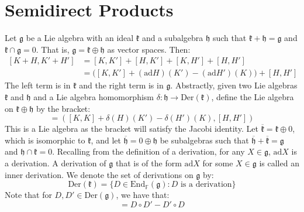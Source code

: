 \documentclass[crop=false,class=article]{standalone}                           %
\begin{document}
    \section{Semidirect Products}
        Let $\mathfrak{g}$ be a Lie algebra with an ideal $\mathfrak{k}$ and a
        subalgebra $\mathfrak{h}$ such that
        $\mathfrak{k}+\mathfrak{h}=\mathfrak{g}$ and
        $\mathfrak{k}\cap\mathfrak{g}=0$. That is,
        $\mathfrak{g}=\mathfrak{k}\oplus\mathfrak{h}$ as vector spaces. Then:
        \begin{subequations}
            \begin{align}
                [K+H,K'+H']&=[K,K']+[H,K']+[K,H']+[H,H']\\
                &=\Big([K,K']+(\textrm{ad}H)(K')-(\textrm{ad}H')(K)\Big)+[H,H']
            \end{align}
        \end{subequations}
        The left term is in $\mathfrak{k}$ and the right term is in
        $\mathfrak{g}$. Abstractly, given two Lie algebras $\mathfrak{k}$ and
        $\mathfrak{h}$ and a Lie algebra homomorphism
        $\delta:\mathfrak{h}\rightarrow\textrm{Der}(\mathfrak{k})$, define the
        Lie algebra on $\mathfrak{k}\oplus\mathfrak{h}$ by the bracket:
        \begin{equation}
            [(K,H),(K',H')]=
            ([K,K]+\delta(H)(K')-\delta(H')(K),[H,H'])
        \end{equation}
        This is a Lie algebra as the bracket will satisfy the Jacobi identity.
        Let $\overline{\mathfrak{k}}=\mathfrak{k}\oplus{0}$, which is isomorphic
        to $\mathfrak{k}$, and let $\overline{\mathfrak{h}}=0\oplus\mathfrak{h}$
        be subalgebras such that
        $\overline{\mathfrak{h}}+\overline{\mathfrak{k}}=\mathfrak{g}$ and
        $\mathfrak{h}\cap\mathfrak{k}=0$. Recalling from the definition of a
        derivation, for any $X\in\mathfrak{g}$, $\textrm{ad}X$ is a derivation.
        A derivation of $\mathfrak{g}$ that is of the form $\textrm{ad}X$ for
        some $X\in\mathfrak{g}$ is called an inner derivation. We denote the
        set of derivations on $\mathfrak{g}$ by:
        \begin{equation}
            \textrm{Der}(\mathfrak{k})=
            \{D\in\textrm{End}_{\mathbb{F}}(\mathfrak{g})
                :D\textrm{ is a derivation}\}
        \end{equation}
        Note that for $D,D'\in\textrm{Der}(\mathfrak{g})$, we have that:
        \begin{equation}
            [D,D']=D\circ{D}'-D'\circ{D}
        \end{equation}
\end{document}
